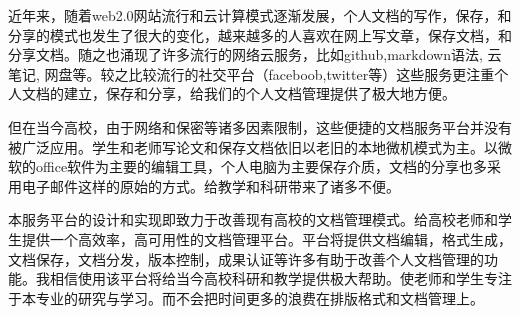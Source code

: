
\begin{cabstract}
近年来，随着web2.0网站流行和云计算模式逐渐发展，个人文档的写作，保存，和分享的模式也发生了很大的变化，越来越多的人喜欢在网上写文章，保存文档，和分享文档。随之也涌现了许多流行的网络云服务，比如github,markdown语法, 云笔记, 网盘等。较之比较流行的社交平台（faceboob,twitter等）这些服务更注重个人文档的建立，保存和分享，给我们的个人文档管理提供了极大地方便。

但在当今高校，由于网络和保密等诸多因素限制，这些便捷的文档服务平台并没有被广泛应用。学生和老师写论文和保存文档依旧以老旧的本地微机模式为主。以微软的office软件为主要的编辑工具，个人电脑为主要保存介质，文档的分享也多采用电子邮件这样的原始的方式。给教学和科研带来了诸多不便。

本服务平台的设计和实现即致力于改善现有高校的文档管理模式。给高校老师和学生提供一个高效率，高可用性的文档管理平台。平台将提供文档编辑，格式生成，文档保存，文档分发，版本控制，成果认证等许多有助于改善个人文档管理的功能。我相信使用该平台将给当今高校科研和教学提供极大帮助。使老师和学生专注于本专业的研究与学习。而不会把时间更多的浪费在排版格式和文档管理上。
\end{cabstract}


